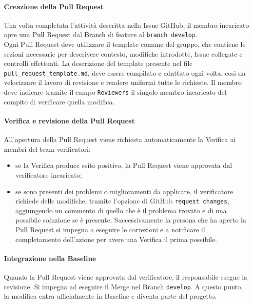 \documentclass[a4paper,12pt]{article}
\newcommand{\ignoreglossary}{}
\begin{document}
\paragraph{Creazione della \ignoreglossary{Pull Request}}
Una volta completata l’attività descritta nella Issue GitHub, il membro incaricato apre una Pull Request dal Branch di feature al \texttt{branch develop}.\\ Ogni Pull Request deve utilizzare il template comune del gruppo, che contiene le sezioni necessarie per descrivere contesto, modifiche introdotte, Issue collegate e controlli effettuati. La descrizione del template presente nel file \texttt{pull\_request\_template.md}, deve essere compilato e adattato ogni volta, così da velocizzare il lavoro di revisione e rendere uniformi tutte le richieste. Il membro deve indicare tramite il campo \texttt{Reviewers} il singolo membro incaricato del compito di verificare quella modifica.

\paragraph{\ignoreglossary{Verifica} e revisione della \ignoreglossary{Pull Request}}
All'apertura della Pull Request viene richiesta automaticamente la Verifica ai membri del team verificatori:
\begin{itemize}
    \item se la Verifica produce esito positivo, la Pull Request viene approvata dal verificatore incaricato;
    \item se sono presenti dei problemi o miglioramenti da applicare, il verificatore richiede delle modifiche, tramite l'opzione di GitHub \texttt{request changes}, aggiungendo un commento di quello che è il problema trovato e di una possibile soluzione se è presente. Successivamente la persona che ha aperto la Pull Request si impegna a eseguire le correzioni e a notificare il completamento dell'azione per avere una Verifica il prima possibile.
\end{itemize}

\paragraph{Integrazione nella \ignoreglossary{Baseline}}
Quando la Pull Request viene approvata dal verificatore, il responsabile esegue la revisione. Si impegna ad eseguire il Merge nel Branch \texttt{develop}. A questo punto, la modifica entra ufficialmente in Baseline e diventa parte del progetto.
\end{document}
